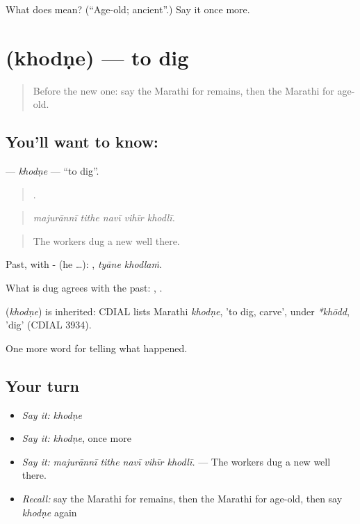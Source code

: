 \begin{tcolorbox}[breakable,colback=teal!4,colframe=teal!35!black,title={Before you move on}]
What does  mean? (\textquotedblleft{}Age-old; ancient\textquotedblright{}.) Say it once more.
\end{tcolorbox}
\section[\texorpdfstring{\mr{खोदणे} (khodṇe)}{खोदणे (khodṇe)}]{ (khodṇe) — to dig}

\label{lesson:MR-C335-khodne}



\begin{quote}
Before the new one: say the Marathi for remains, then the Marathi for age-old.
\end{quote}

\subsection*{You'll want to know: }
\textbf{} — \emph{khodṇe} — \textquotedblleft{}to dig\textquotedblright{}.

\begin{quote}
    .
\end{quote}

\begin{quote}
\emph{majurānnī tithe navī vihīr khodlī.}
\end{quote}

\begin{quote}
The workers dug a new well there.
\end{quote}

Past, with - (he …):  , \emph{tyāne khodlaṁ}.

What is dug agrees with the past:  ,  .

\begin{cousinweb}
\textbf{} (\emph{khodṇe}) is inherited: CDIAL lists Marathi \emph{khodṇe}, 'to dig, carve', under \emph{*khōdd}, 'dig' (CDIAL 3934).
\end{cousinweb}

\begin{grammarlens}[title={What you've built}]
One more word for telling what happened.
\end{grammarlens}

\subsection*{Your turn}
\begin{itemize}
\raggedright
  \item \emph{Say it:} \emph{khodṇe}
  \item \emph{Say it:} \emph{khodṇe}, once more
  \item \emph{Say it:} \emph{majurānnī tithe navī vihīr khodlī.} — The workers dug a new well there.
  \item \emph{Recall:} say the Marathi for remains, then the Marathi for age-old, then say \emph{khodṇe} again
\end{itemize}

